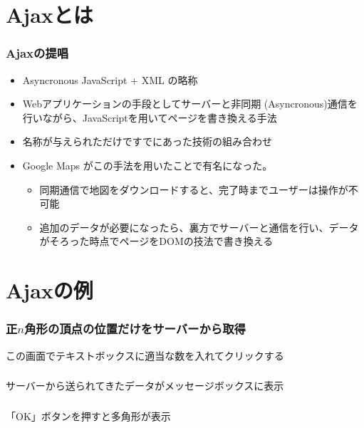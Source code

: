 

\frame{\maketitle}
\section{Ajaxとは}
\begin{frame}[containsverbatim]
 \frametitle{Ajaxの提唱}
 \begin{itemize}
  \item Asyncronous JavaScript + XML の略称
  \item Webアプリケーションの手段としてサーバーと非同期
(Asyncronous)通信を行いながら、JavaScriptを用いてページを書き換える手法
  \item 名称が与えられただけですでにあった技術の組み合わせ
  \item Google Maps がこの手法を用いたことで有名になった。
 \begin{itemize}
  \item 同期通信で地図をダウンロードすると、完了時までユーザーは操作が不
        可能
  \item 追加のデータが必要になったら、裏方でサーバーと通信を行い、データ
        がそろった時点でページをDOMの技法で書き換える
 \end{itemize}
 \end{itemize}
\end{frame}
\section{Ajaxの例}
\begin{frame}[containsverbatim]
 \frametitle{正$n$角形の頂点の位置だけをサーバーから取得}
 この画面でテキストボックスに適当な数を入れてクリックする
\end{frame}
\begin{frame}[containsverbatim]
\frametitle{}
サーバーから送られてきたデータがメッセージボックスに表示
\end{frame}
\begin{frame}[containsverbatim]
\frametitle{}
 「OK」ボタンを押すと多角形が表示
\end{frame}

